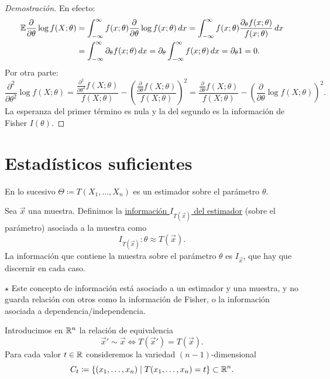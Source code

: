\begin{proof}[Demostración]
En efecto:
\begin{align*}
    \mathbb{E}\frac{\partial}{\partial\theta}\log f(X;\theta) & = \int_{-\infty}^{\infty} f(x;\theta)\frac{\partial}{\partial\theta}\log f(x;\theta)\,dx = \int_{-\infty}^{\infty} f(x;\theta)\frac{\partial_\theta f(x;\theta)}{f(x;\theta)}\,dx \\ & = \int_{-\infty}^{\infty} \partial_\theta f(x;\theta)\,dx = \partial_\theta \int_{-\infty}^{\infty} f(x;\theta)\,dx = \partial_\theta 1 = 0.
\end{align*}
Por otra parte:
\[
  \frac{\partial^2}{\partial\theta^2}\log f(X;\theta) = \frac{\frac{\partial^2}{\partial\theta^2} f(X;\theta)}{f(X;\theta)} - \left(\frac{\frac{\partial}{\partial\theta} f(X;\theta)}{f(X;\theta)}\right)^2 = \frac{\frac{\partial}{\partial\theta}f(X;\theta)}{f(X;\theta)} - \left(\frac{\partial}{\partial\theta}\log f(X;\theta)\right)^2.
\]
La esperanza del primer término es nula y la del segundo es la información de Fisher $I(\theta)$.
\end{proof}

\section{Estadísticos suficientes}

En lo sucesivo $\Theta \coloneqq T(X_1, \dots, X_n)$ es un estimador sobre el parámetro $\theta$.

\begin{definicion}[2]
Sea $\vec{x}$ una muestra. Definimos la \underline{información $I_{T(\vec{x})}$ del estimador} (sobre el parámetro) asociada a la muestra como
\[
  I_{T(\vec{x})} : \theta \approx T(\vec{x}).
\]
La información que contiene la muestra sobre el parámetro $\theta$ es $I_{\vec{x}}$, que hay que discernir en cada caso.
\end{definicion}

\noindent $\star$ Este concepto de información está asociado a un estimador y una muestra, y no guarda relación con otros como la información de Fisher, o la información asociada a dependencia/independencia.

\begin{definicion}[3]
Introducimos en $\mathbb{R}^n$ la relación de equivalencia
\[
  \vec{x}' \sim \vec{x} \iff T(\vec{x}') = T(\vec{x}).
\]
Para cada valor $t \in \mathbb{R}$ consideremos la variedad $(n-1)$-dimensional
\[
  C_t \coloneqq \{(x_1, \dots, x_n) \mid T(x_1, \dots, x_n) = t\} \subset \mathbb{R}^n.
\]
\end{definicion}

